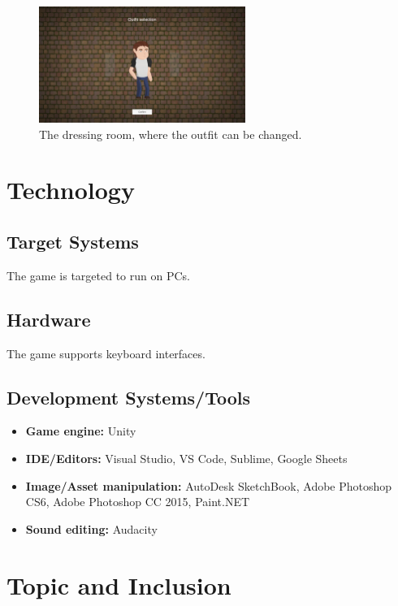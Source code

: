 \documentclass[a4paper]{scrreprt}
\begin{document}
\begin{figure}[h]
\centering
\includegraphics[width=0.6\textwidth]{dressing.png}
\caption{The dressing room, where the outfit can be changed.}
\label{fig:char}
\end{figure}




\chapter{Technology}

\section{Target Systems}
The game is targeted to run on PCs.

\section{Hardware}
The game supports keyboard interfaces.

\section{Development Systems/Tools}
\begin{itemize}
    \item \textbf{Game engine:} Unity
    \item \textbf{IDE/Editors:} Visual Studio, VS Code, Sublime, Google Sheets
    \item \textbf{Image/Asset manipulation:} AutoDesk SketchBook, Adobe Photoshop CS6, Adobe Photoshop CC 2015, Paint.NET
    \item \textbf{Sound editing:} Audacity
\end{itemize}


\chapter{Topic and Inclusion }
\end{document}
